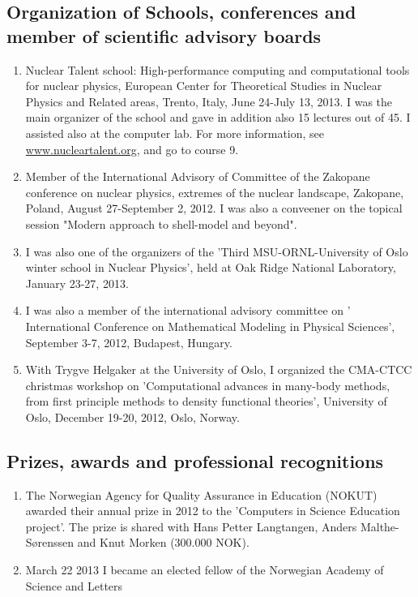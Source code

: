 \documentclass[prc,amsart,english,twocolumn,superscriptaddress,showpacs,floatfix]{revtex4}
\begin{document}
 \subsection*{Organization of Schools, conferences and member of scientific advisory boards}

\begin{enumerate}
\item Nuclear Talent school: High-performance computing and computational tools for nuclear physics, European
Center for Theoretical Studies in Nuclear Physics and Related areas, Trento, Italy, June 24-July 13, 2013.
I was the main organizer of the school and gave in addition also 15 lectures out of 45. I assisted also at the computer lab.
For more information, see \url{www.nucleartalent.org}, and go to course 9.

\item  Member of the International Advisory of Committee of the Zakopane conference on nuclear physics, extremes of the nuclear landscape, Zakopane, Poland, August 27-September 2, 2012. I was also a conveener on the topical session   "Modern approach to shell-model and beyond".

\item  I was also one of the organizers of the 'Third MSU-ORNL-University of Oslo winter school in Nuclear Physics', held at 
Oak Ridge National Laboratory, January 23-27, 2013. 

\item  I was also a member of the international advisory committee on ' International Conference on Mathematical 
Modeling in Physical Sciences', September 3-7, 2012, Budapest, Hungary.

\item  With Trygve Helgaker at the University of Oslo, I organized the  CMA-CTCC christmas workshop on
'Computational advances in many-body methods, from first principle methods to density functional theories', University of Oslo, 
December 19-20, 2012, Oslo, Norway.
\end{enumerate}

 \subsection*{Prizes, awards and professional recognitions}
\begin{enumerate}
\item 
The Norwegian Agency for Quality Assurance in Education (NOKUT) awarded their annual prize in 2012 
to the 'Computers in Science Education project'. The prize is shared with Hans Petter Langtangen, Anders Malthe-S\o renssen and Knut Morken (300.000 NOK).

\item March 22 2013 I became an elected fellow of the Norwegian Academy of Science and Letters

\end{enumerate}
\end{document}
